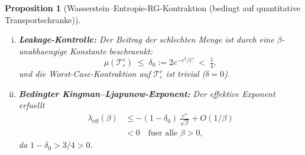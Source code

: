 \documentclass[12pt,a4paper]{article}
\theoremstyle{definition}
\theoremstyle{plain}
\newtheorem{proposition}[definition]{Proposition}
\theoremstyle{remark}
\begin{document}
\begin{proposition}[Wasserstein--Entropie-RG-Kontraktion (bedingt auf quantitative Transportschranke)]
\begin{enumerate}[(i)]
\item \textbf{Leakage-Kontrolle:}
  Der Beitrag der schlechten Menge ist durch eine $\beta$-unabhaengige Konstante beschraenkt:
  \[
    \mu(\mathcal{T}_\varepsilon^c) \;\leq\; \delta_0 := 2e^{-c^2/C} \;<\; \tfrac{1}{4},
  \]
  und die Worst-Case-Kontraktion auf $\mathcal{T}_\varepsilon^c$ ist trivial ($\delta = 0$).

\item \textbf{Bedingter Kingman--Ljapunow-Exponent:}
  Der effektive Exponent erfuellt
  \begin{equation}\label{eq:lambda-polynomial}
  \begin{aligned}
    \lambda_{\mathrm{eff}}(\beta)
    &\leq -(1 - \delta_0)\,\frac{c''}{\sqrt{\beta}} + O(1/\beta)\\
    &< 0 \quad\text{fuer alle } \beta > 0,
  \end{aligned}
  \end{equation}
  da $1 - \delta_0 > 3/4 > 0$.
\end{enumerate}
\end{proposition}
\end{document}
